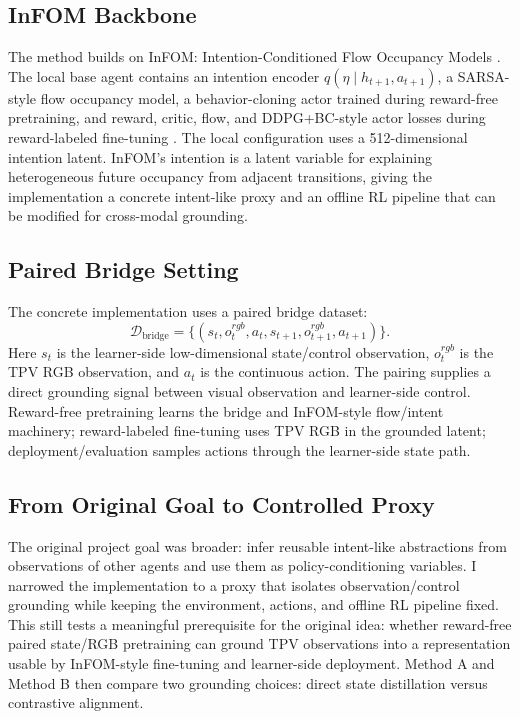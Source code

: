 \documentclass{article}
\begin{document}
\subsection{InFOM Backbone}

The method builds on InFOM: Intention-Conditioned Flow Occupancy Models \citep{Zheng2025InFOM}. The local base agent contains an intention encoder $q(\eta \mid h_{t+1}, a_{t+1})$, a SARSA-style flow occupancy model, a behavior-cloning actor trained during reward-free pretraining, and reward, critic, flow, and DDPG+BC-style actor losses during reward-labeled fine-tuning \citep{Fujimoto2021TD3BC}. The local configuration uses a 512-dimensional intention latent. InFOM's intention is a latent variable for explaining heterogeneous future occupancy from adjacent transitions, giving the implementation a concrete intent-like proxy and an offline RL pipeline that can be modified for cross-modal grounding.

\subsection{Paired Bridge Setting}

The concrete implementation uses a paired bridge dataset:
\begin{equation}
    \mathcal{D}_{\mathrm{bridge}} =
    \{(s_t, o^{rgb}_t, a_t, s_{t+1}, o^{rgb}_{t+1}, a_{t+1})\}.
\end{equation}
Here $s_t$ is the learner-side low-dimensional state/control observation, $o^{rgb}_t$ is the TPV RGB observation, and $a_t$ is the continuous action. The pairing supplies a direct grounding signal between visual observation and learner-side control. Reward-free pretraining learns the bridge and InFOM-style flow/intent machinery; reward-labeled fine-tuning uses TPV RGB in the grounded latent; deployment/evaluation samples actions through the learner-side state path.

\subsection{From Original Goal to Controlled Proxy}

The original project goal was broader: infer reusable intent-like abstractions from observations of other agents and use them as policy-conditioning variables. I narrowed the implementation to a proxy that isolates observation/control grounding while keeping the environment, actions, and offline RL pipeline fixed. This still tests a meaningful prerequisite for the original idea: whether reward-free paired state/RGB pretraining can ground TPV observations into a representation usable by InFOM-style fine-tuning and learner-side deployment. Method A and Method B then compare two grounding choices: direct state distillation versus contrastive alignment.
\end{document}
